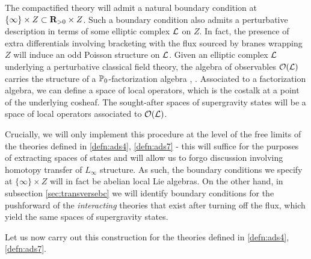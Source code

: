 \documentclass[../main.tex]{subfiles}
\begin{document}
The compactified theory will admit a natural boundary condition at $\{\infty\}\times Z\subset \mathbf{R}_{>0}\times Z$.
Such a boundary condition also admits a perturbative description in terms of some elliptic complex $\mathcal{L}$ on $Z$.
In fact, the presence of extra differentials involving bracketing with the flux sourced by branes wrapping $Z$ will induce an odd Poisson structure on $\mathcal{L}$.
Given an elliptic complex $\mathcal L$ underlying a perturbative classical field theory, the algebra of observables $\mathcal O(\mathcal L)$ carries the structure of a $\mathbb{P}_0$-factorization algebra \cite{CG1}, \cite{CG2}. 
Associated to a factorization algebra, we can define a space of local operators, which is the costalk at a point of the underlying cosheaf.
The sought-after spaces of supergravity states will be a space of local operators associated to $\mathcal O(\mathcal L)$. 

\begin{rmk}
Crucially, we will only implement this procedure at the level of the free limits of the theories defined in \ref{defn:ads4}, \ref{defn:ads7} - this will suffice for the purposes of extracting spaces of states and will allow us to forgo discussion involving homotopy transfer of $L_\infty$ structure. As such, the boundary conditions we specify at $\{\infty\}\times Z$ will in fact be abelian local Lie algebras. On the other hand, in subsection \ref{sec:transversebc} we will identify boundary conditions for the pushforward of the \textit{interacting} theories that exist after turning off the flux, which yield the same spaces of supergravity states. 
\end{rmk}

Let us now carry out this construction for the theories defined in \ref{defn:ads4}, \ref{defn:ads7}.



\end{document}
